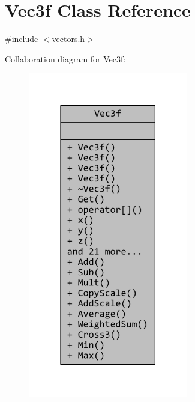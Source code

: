 \hypertarget{classVec3f}{\section{Vec3f Class Reference}
\label{classVec3f}
}


{\ttfamily \#include $<$vectors.\+h$>$}



Collaboration diagram for Vec3f\+:
\nopagebreak
\begin{figure}[H]
\begin{center}
\leavevmode
\includegraphics[width=198pt]{classVec3f__coll__graph}
\end{center}
\end{figure}
